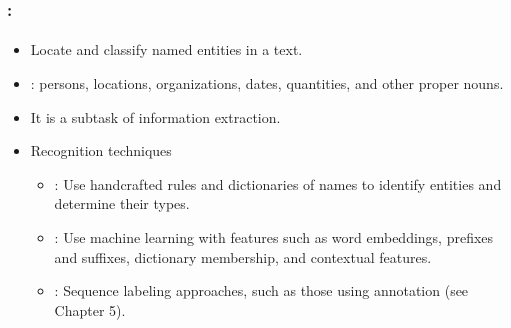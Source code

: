 \documentclass[xcolor=table]{beamer}
\begin{document}
\begin{frame}
	\frametitle{\insertshortsubtitle: \insertsection}
	\framesubtitle{\insertsubsection}
	
	\begin{itemize}
		\item Locate and classify named entities in a text.
		
		\item {}: persons, locations, organizations, dates, quantities, and other proper nouns.
		
		\item It is a subtask of information extraction.
		
		\item Recognition techniques
		\begin{itemize}
			\item {}: 
			Use handcrafted rules and dictionaries of names to identify entities and determine their types.
			
			\item {}:
			Use machine learning with features such as word embeddings, prefixes and suffixes, dictionary membership, and contextual features.
			
			\item {}: 
			Sequence labeling approaches, such as those using  annotation (see Chapter 5).
			
			
		\end{itemize}
	\end{itemize}
	
\end{frame}


\end{document}
